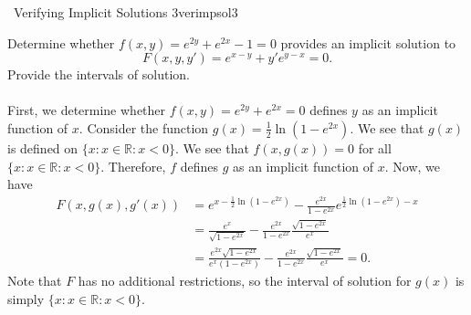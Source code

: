 \pagebreak

        \begin{example}{\Difficulty\,\Difficulty\,\,Verifying Implicit Solutions 3}{verimpsol3}
                    
            Determine whether \(f(x,y)=e^{2y}+e^{2x}-1=0\) provides an implicit solution to
            \begin{equation*}
                F(x,y,y')=e^{x-y}+y'e^{y-x}=0.
            \end{equation*}
            Provide the intervals of solution.
            \\
            \\
            First, we determine whether \(f(x,y)=e^{2y}+e^{2x}=0\) defines \(y\) as an implicit function of \(x\). Consider the function \(g(x)=\frac{1}{2}\ln(1-e^{2x})\). We see that \(g(x)\) is defined on \(\{x:x\in\mathbb{R}:x<0\}\). We see that \(f(x,g(x))=0\) for all \(\{x:x\in\mathbb{R}:x<0\}\). Therefore, \(f\) defines \(g\) as an implicit function of \(x\). Now, we have
            \begin{align*}
                F(x,g(x),g'(x))&=e^{x-\frac{1}{2}\ln(1-e^{2x})}-\frac{e^{2x}}{1-e^{2x}}e^{\frac{1}{2}\ln(1-e^{2x})-x} \\
                &=\frac{e^x}{\sqrt{1-e^{2x}}}-\frac{e^{2x}}{1-e^{2x}}\frac{\sqrt{1-e^{2x}}}{e^x} \\
                &=\frac{e^{2x}\sqrt{1-e^{2x}}}{e^x(1-e^{2x})}-\frac{e^{2x}}{1-e^{2x}}\frac{\sqrt{1-e^{2x}}}{e^x}=0.
            \end{align*}
            Note that \(F\) has no additional restrictions, so the interval of solution for \(g(x)\) is simply \(\{x:x\in\mathbb{R}:x<0\}\).
            
        \end{example}
        \pagebreak
